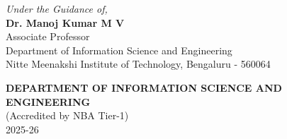 \documentclass[12pt,a4paper,twoside,openright,one column,notitlepage]{report}
\newcommand\blankpage{%
	\null
	\thispagestyle{empty}%
	\addtocounter{page}{-1}%
	\newpage}
\begin{document}
\begin{titlepage}
\begin{center}
			\vspace{0.4cm}
			\small \textit{Under the Guidance of,}\\
			\vspace{0.2cm}
			\large {\textbf{Dr. Manoj Kumar M V}}\\
			\vspace{0.2cm}
			\small {Associate Professor}\\
			\vspace{0.2cm}
			\small {Department of Information Science and Engineering}\\
			\vspace{0.2cm}
			\small {Nitte Meenakshi Institute of Technology, Bengaluru - 560064}\\
			\vspace{0.3cm}
			
			\large \textbf{DEPARTMENT OF INFORMATION SCIENCE AND ENGINEERING}\\
			\small {(Accredited by NBA Tier-1)}\\\vspace{0.2cm}
			\small {2025-26}    
		\end{center}
	\end{titlepage}
	


\blankpage %

\tableofcontents
\blankpage %

















	
\end{document}
